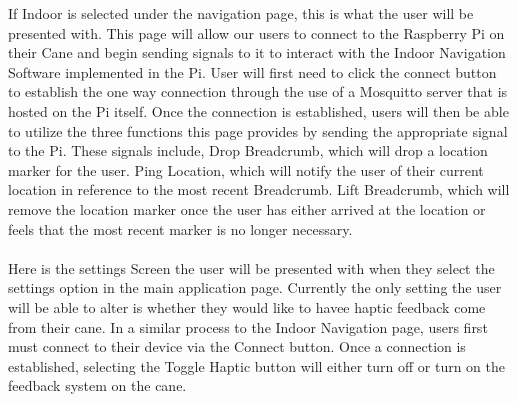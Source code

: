 \documentclass[letterpaper,12pt]{article}
\begin{document}
    If Indoor is selected under the navigation page, this is what the user will be presented with. This page will allow our users to connect to the Raspberry Pi on their Cane and begin sending signals to it to interact with the Indoor Navigation Software implemented in the Pi. User will first need to click the connect button to establish the one way connection through the use of a Mosquitto server that is hosted on the Pi itself. Once the connection is established, users will then be able to utilize the three functions this page provides by sending the appropriate signal to the Pi. These signals include, Drop Breadcrumb, which will drop a location marker for the user. Ping Location, which will notify the user of their current location in reference to the most recent Breadcrumb. Lift Breadcrumb, which will remove the location marker once the user has either arrived at the location or feels that the most recent marker is no longer necessary. \\
    
    
 \\

    Here is the settings Screen the user will be presented with when they select the settings option in the main application page. Currently the only setting the user will be able to alter is whether they would like to havee haptic feedback come from their cane. In a similar process to the Indoor Navigation page, users first must connect to their device via the Connect button. Once a connection is established, selecting the Toggle Haptic button will either turn off or turn on the feedback system on the cane. 

\newpage
\end{document}
